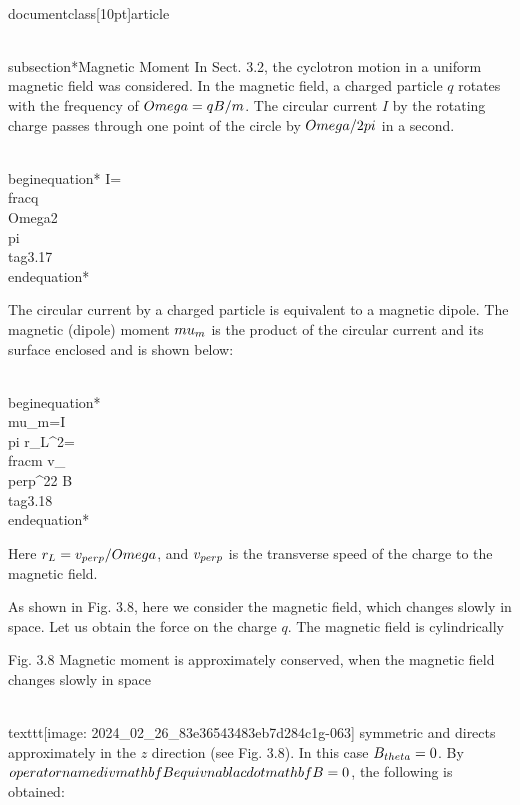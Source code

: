 \\documentclass[10pt]{article}
\begin{document}
\\subsection*{Magnetic Moment}
In Sect. 3.2, the cyclotron motion in a uniform magnetic field was considered. In the magnetic field, a charged particle $q$ rotates with the frequency of $\\Omega=q B / m$. The circular current $I$ by the rotating charge passes through one point of the circle by $\\Omega / 2 \\pi$ in a second.


\\begin{equation*}
I=\\frac{q \\Omega}{2 \\pi} \\tag{3.17}
\\end{equation*}


The circular current by a charged particle is equivalent to a magnetic dipole. The magnetic (dipole) moment $\\mu_{m}$ is the product of the circular current and its surface enclosed and is shown below:


\\begin{equation*}
\\mu_{m}=I \\pi r_{L}^{2}=\\frac{m v_{\\perp}^{2}}{2 B} \\tag{3.18}
\\end{equation*}


Here $r_{L}=v_{\\perp} / \\Omega$, and $v_{\\perp}$ is the transverse speed of the charge to the magnetic field.

As shown in Fig. 3.8, here we consider the magnetic field, which changes slowly in space. Let us obtain the force on the charge $q$. The magnetic field is cylindrically

Fig. 3.8 Magnetic moment is approximately conserved, when the magnetic field changes slowly in space

\\texttt{[image: 2024\_02\_26\_83e36543483eb7d284c1g-063]}
symmetric and directs approximately in the $z$ direction (see Fig. 3.8). In this case $B_{\\theta}=0$. By $\\operatorname{div} \\mathbf{B} \\equiv \\nabla \\cdot \\mathbf{B}=0$, the following is obtained:
\end{document}
